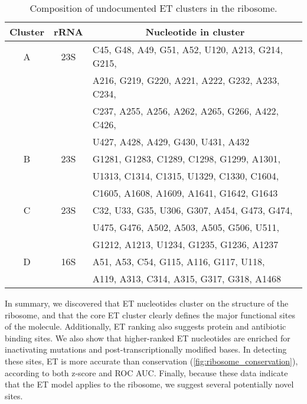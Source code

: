 \documentclass[12pt,a4paper]{report}
\begin{document}
\begin{table*}
\begin{minipage}[c][\textheight]{\textwidth}
\centering
\vspace{-6in}
\setlength{\tabcolsep}{5pt} %
\renewcommand{\arraystretch}{0.5} %
\begin{tabular}{| ccl |}
\multicolumn{1}{c}{\textbf{Cluster}} &
\multicolumn{1}{c}{\textbf{rRNA}} & 
  \multicolumn{1}{c}{\textbf{Nucleotide in cluster}}\\\hline

A       & 23S  & C45, G48, A49, G51, A52, U120, A213, G214, G215,\\
&&					 A216, G219, G220, A221, A222, G232, A233, C234, \\
&&					 C237, A255, A256, A262, A265, G266, A422, C426, \\
&&					 U427, A428, A429, G430, U431, A432 \\ \hline
B       & 23S  & G1281, G1283, C1289, C1298, G1299, A1301, \\
				&&	U1313, C1314, C1315, U1329, C1330, C1604, \\
				&&C1605, A1608, A1609, A1641, G1642, G1643 \\ \hline
C & 23S & C32, U33, G35, U306, G307, A454, G473, G474,\\
&& U475, G476, A502, A503, A505, G506, U511, \\
&& G1212, A1213, U1234, G1235, G1236, A1237 \\ \hline
D& 16S & A51, A53, C54, G115, A116, G117, U118, \\
			&&  A119, A313, C314, A315, G317, G318, A1468\\ \hline
                                                                                                                                  
\end{tabular}
 \caption[Composition of undocumented ET clusters in the ribosome.]{Composition of undocumented ET clusters in the ribosome.}
  \label{table:table2}
    \end{minipage}
\end{table*}

In summary, we discovered that ET nucleotides cluster on the structure of the ribosome, and that the core ET cluster clearly defines the major functional sites of the molecule. Additionally, ET ranking also suggests protein and antibiotic binding sites. We also show that higher-ranked ET nucleotides are enriched for inactivating mutations and post-transcriptionally modified bases. In detecting these sites, ET is more accurate than conservation (\ref{fig:ribosome_conservation}), according to both z-score and ROC AUC. Finally, because these data indicate that the ET model applies to the ribosome, we suggest several potentially novel sites.
\end{document}
